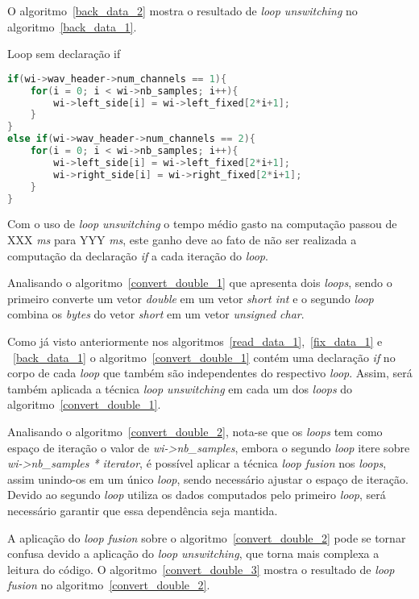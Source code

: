 O algoritmo~\ref{back_data_2} mostra o resultado de \textit{loop unswitching} no
algoritmo~\ref{back_data_1}.

\begin{algorithm}
\caption{Loop sem declaração if }
\label{back_data_2}
\begin{lstlisting}[language=c]
if(wi->wav_header->num_channels == 1){
    for(i = 0; i < wi->nb_samples; i++){
        wi->left_side[i] = wi->left_fixed[2*i+1]; 
    }
}
else if(wi->wav_header->num_channels == 2){
    for(i = 0; i < wi->nb_samples; i++){
        wi->left_side[i] = wi->left_fixed[2*i+1]; 
        wi->right_side[i] = wi->right_fixed[2*i+1]; 
    }
}
\end{lstlisting}
\end{algorithm}

Com o uso de \textit{loop unswitching} o tempo médio gasto na computação passou
de XXX \textit{ms} para YYY \textit{ms}, este ganho deve ao fato de não ser
realizada a computação da declaração \textit{if} a cada iteração do
\textit{loop}.


Analisando o algoritmo~\ref{convert_double_1} que apresenta dois \textit{loops},
sendo o primeiro converte um vetor \textit{double} em um vetor 
\textit{short int} e o segundo \textit{loop} combina os \textit{bytes} do vetor
\textit{short} em um vetor \textit{unsigned char}.

Como já visto anteriormente nos algoritmos~\ref{read_data_1},~\ref{fix_data_1} e
~\ref{back_data_1} 
o algoritmo~\ref{convert_double_1} contém uma declaração \textit{if} no corpo de
cada \textit{loop} que também são independentes do respectivo \textit{loop}. 
Assim, será também aplicada a técnica \textit{loop unswitching} em cada um dos
\textit{loops} do algoritmo~\ref{convert_double_1}.


Analisando o algoritmo~\ref{convert_double_2}, nota-se que os 
\textit{loops} tem como
espaço de iteração o valor de \textit{wi->nb\_samples}, embora o segundo
\textit{loop} itere sobre \textit{wi->nb\_samples * iterator},  é possível aplicar
a técnica \textit{loop fusion} nos \textit{loops}, assim unindo-os em um
único \textit{loop}, sendo necessário ajustar o espaço de iteração. 
Devido ao
segundo \textit{loop} utiliza os dados computados pelo primeiro \textit{loop},
será necessário garantir que essa dependência seja mantida.

A aplicação do \textit{loop fusion} sobre o
algoritmo~\ref{convert_double_2} pode se tornar confusa devido a aplicação do
\textit{loop unswitching}, que torna mais complexa a leitura do código. O
algoritmo~\ref{convert_double_3} mostra o 
resultado de \textit{loop fusion} no algoritmo~\ref{convert_double_2}. 


